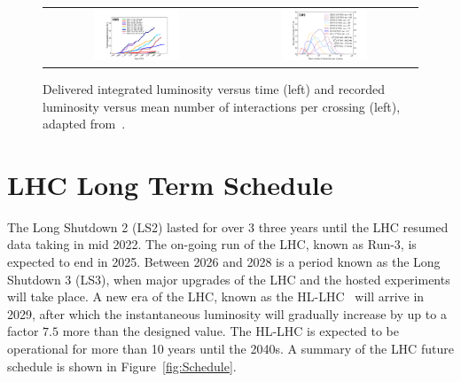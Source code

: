 \begin{figure}[tbh!]
 \begin{center}
 \begin{tabular}{cc}
 \includegraphics[width=0.48\textwidth]{figures/Part2/LHC/twikilumi}&
 \includegraphics[width=0.48\textwidth]{figures/Part2/LHC/twikipu}\\
 \end{tabular}
 \caption{Delivered integrated luminosity versus time (left) and recorded luminosity versus mean number of interactions per crossing (left), adapted from~\cite{twiki:lumi}.}
 \label{fig:twikilumi}
 \end{center}
\end{figure} 

\section{LHC Long Term Schedule}
\label{sec:Plan}

The Long Shutdown 2 (LS2) lasted for over 3 three years until the \ac{LHC} resumed data taking in mid 2022. The on-going run of the \ac{LHC}, known as Run-3, is expected to end in 2025. Between 2026 and 2028 is a period known as the Long Shutdown 3 (LS3), when major upgrades of the \ac{LHC} and the hosted experiments will take place. A new era of the \ac{LHC}, known as the \ac{HL-LHC}~\cite{Apollinari:2017lan} will arrive in 2029, after which the instantaneous luminosity will gradually increase by up to a factor $7.5$ more than the designed value. The \ac{HL-LHC} is expected to be operational for more than 10 years until the 2040s. A summary of the \ac{LHC} future schedule is shown in Figure~\ref{fig:Schedule}.

